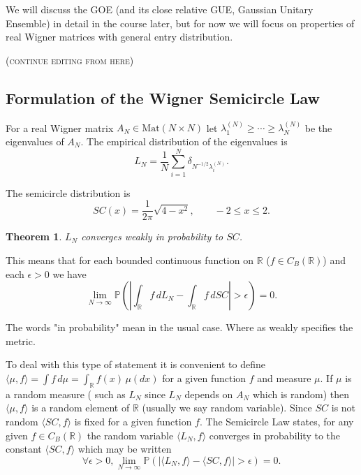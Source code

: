 \documentclass[letterpaper,11pt,oneside,reqno]{amsart}
\numberwithin{equation}{section}
\newcommand{\note}[1]{\textsc{\color{blue}(#1)}}
\newtheorem{theorem}[proposition]{Theorem}
\theoremstyle{definition}
\begin{document}
We will discuss the GOE (and its close relative GUE, Gaussian Unitary Ensemble)
in detail in the course later, but for now we will focus on 
properties of real Wigner matrices with general entry distribution.


\note{continue editing from here}

\subsection{Formulation of the Wigner Semicircle Law} %
\label{sub:formulation_of_the_wigner_semicircle_law}

For a real Wigner matrix $A_N\in\mathrm{Mat}(N\times N)$ let
$\lambda_1^{(N)}\geq \cdots \geq \lambda_N^{(N)}$ be the eigenvalues of $A_N$.
The empirical distribution of the eigenvalues is
\begin{equation}\label{EmpericalDistributionOfEigenvalues}
	L_N=\frac{1}{N}\sum_{i=1}^N \delta_{N^{-1/2}\lambda_{i}^{(N)}}.
\end{equation}

The semicircle distribution is 
\begin{equation}\label{SemicircleDistribution}
SC(x)=\frac{1}{2\pi}\sqrt{4-x^2}, \qquad -2\leq x\leq 2.
\end{equation}

\begin{theorem}\label{SemicircleLaw}
$L_N$ converges weakly in probability to $SC$.
\end{theorem}

This means that for each bounded continuous function on $\mathbb R$ ($f\in C_B(\mathbb R)$) and each $\epsilon>0$ we have 
\begin{equation*}
\lim_{N\to\infty}\mathbb P\left(\left|\int_{\mathbb R} f\,dL_N-\int_{\mathbb R} f\,dSC\right|>\epsilon\right)=0.
\end{equation*}

The words "in probability" mean in the usual case.  Where as weakly specifies the metric.

To deal with this type of statement it is convenient to define $\langle \mu, f\rangle=\int f\,d\mu=\int_{\mathbb R}f(x)\,\mu(dx)$ for a given function $f$ and measure $\mu$.  If $\mu$ is a random measure ( such as $L_N$ since $L_N$ depends on $A_N$ which is random) then $\langle \mu, f\rangle$ is a random element of $\mathbb R$ (usually we say random variable).  Since $SC$ is not random $\langle SC, f\rangle$ is fixed for a given function $f$.  The Semicircle Law states, for any given $f\in C_B(\mathbb R)$ the random variable $\langle L_N, f\rangle$ converges in probability to the constant $\langle SC, f\rangle$ which may be written
\begin{equation}\label{StarSemicrcleLaw}
\forall \epsilon>0,\lim_{N\to\infty}\mathbb P\left(\left|\langle L_N, f\rangle-\langle SC,f\rangle\right|>\epsilon\right)=0.
\end{equation}
\end{document}
